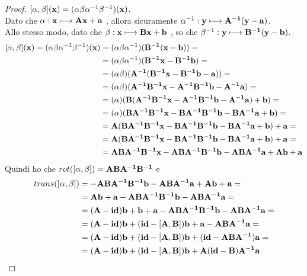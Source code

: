 \documentclass[10pt,a4paper]{article}
\begin{document}
\begin{proof}
	$ [ \alpha, \beta ](\vb{x}) = ( \alpha \beta \alpha^{-1} \beta^{-1} ) (\vb{x})$. \\
	Dato che $ \alpha : \vb{x} \longmapsto \vb{Ax + a}$ , allora sicuramente  $\alpha^{-1}: \vb{y} \longmapsto \vb{A^{-1}(y-a)}$.  \\
	Allo stesso modo, dato che $ \beta : \vb{x} \longmapsto \vb{Bx + b}$ , so che $\beta^{-1}: \vb{y} \longmapsto \vb{B^{-1}(y-b)}$. 
\begin{equation*}
\begin{split}
[ \alpha, \beta ](\vb{x}) = (\alpha \beta \alpha^{-1} \beta^{-1} ) (\vb{x})
& = (\alpha \beta \alpha^{-1})( \vb{B^{-1}(x-b)}) = \\ 
& = (\alpha \beta \alpha^{-1})( \vb{B^{-1}x- B^{-1}b }) = \\ 
& = (\alpha \beta)(\vb{A^{-1}( B^{-1}x- B^{-1}b -a)})= \\
& =  (\alpha \beta)(\vb{A^{-1} B^{-1}x- A^{-1}B^{-1}b -A^{-1}a})  = \\
& = (\alpha)(\vb{B(A^{-1} B^{-1}x- A^{-1}B^{-1}b -A^{-1}a) +b}) = \\
& = (\alpha)(\vb{BA^{-1} B^{-1}x-BA^{-1}B^{-1}b -BA^{-1}a +b}) = \\
& = \vb{A(BA^{-1} B^{-1}x-BA^{-1}B^{-1}b -BA^{-1}a +b) + a} = \\
& = \vb{A(BA^{-1} B^{-1}x-BA^{-1}B^{-1}b -BA^{-1}a +b) + a} = \\
& = \vb{ABA^{-1} B^{-1}x-ABA^{-1}B^{-1}b -ABA^{-1}a +Ab + a }
\end{split}
\end{equation*}
Quindi ho che $ rot([ \alpha , \beta ]) = \vb{ABA^{-1} B^{-1} }$ e
\begin{equation*}
\begin{split}
trans([ \alpha, \beta ]) & = \vb{-ABA^{-1}B^{-1}b -ABA^{-1}a +Ab + a }= \\
& = \vb{Ab + a -ABA^{-1}B^{-1}b -ABA^{-1}a }= \\
& = \vb{(A-id)b + b + a -ABA^{-1}B^{-1}b -ABA^{-1}a} = \\
& = \vb{(A-id)b + (id-[A,B])b + a - ABA^{-1}a} = \\
& = \vb{(A-id)b + (id-[A,B])b + (id- ABA^{-1})a }= \\
& = \vb{(A-id)b + (id-[A,B])b + A(id- B)A^{-1}a} 
\end{split}
\end{equation*}	
\end{proof}
\end{document}
